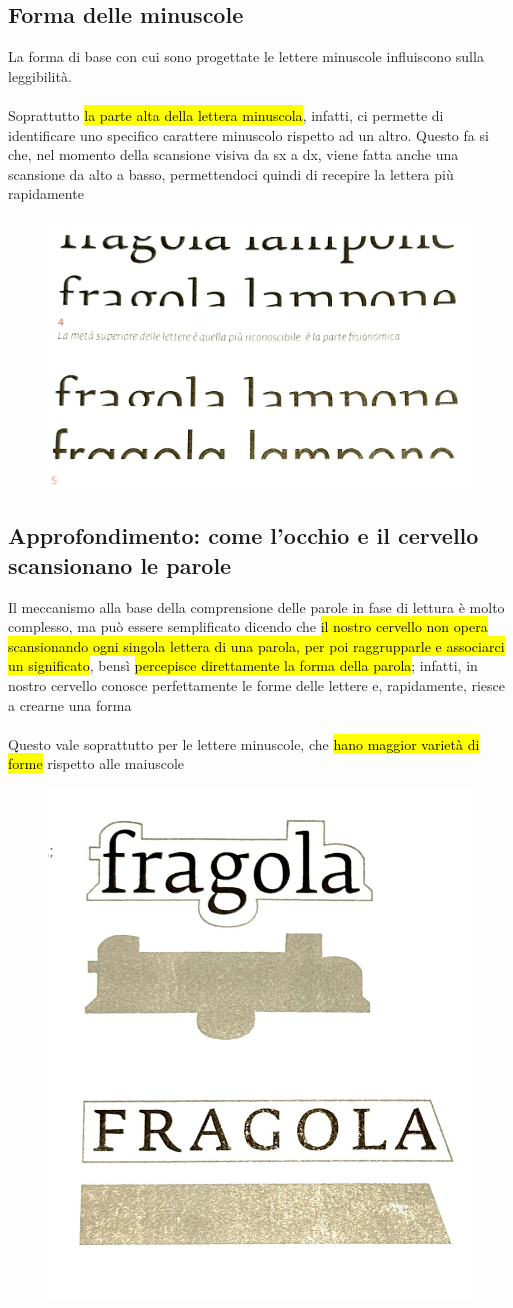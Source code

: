 \subsection{Forma delle minuscole}
La forma di base con cui sono progettate le lettere minuscole influiscono sulla leggibilità.
\\\\
Soprattutto \hl{ la parte alta della lettera minuscola}, infatti, ci permette di identificare uno specifico carattere minuscolo rispetto ad un altro.
Questo fa si che, nel momento della scansione visiva da sx a dx, viene fatta anche una scansione da alto a basso, permettendoci quindi di recepire la lettera più rapidamente
\begin{figure}[H]
    \centering
    \includegraphics[width=0.3\linewidth]{blocco_2 - spiegazioni teorico-pratiche/imgs/f5.jpg}
\end{figure}
\subsection{Approfondimento: come l'occhio e il cervello scansionano le parole}
Il meccanismo alla base della comprensione delle parole in fase di lettura è molto complesso, ma può essere semplificato dicendo che \hl{il nostro cervello non opera scansionando ogni singola lettera di una parola, per poi raggrupparle e associarci un significato}, bensì \hl{percepisce direttamente la forma della parola}; infatti, in nostro cervello conosce perfettamente le forme delle lettere e, rapidamente, riesce a crearne una forma
\\\\
Questo vale soprattutto per le lettere minuscole, che \hl{hano maggior varietà di forme} rispetto alle maiuscole
\begin{figure}[H]
    \centering
    \includegraphics[width=0.3\linewidth]{blocco_2 - spiegazioni teorico-pratiche/imgs/f6.jpg}
\end{figure}
